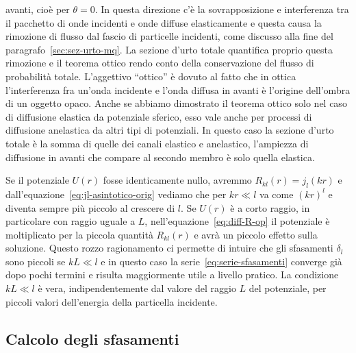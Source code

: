 \documentclass[a4paper,fleqn,twoside,12pt]{article}
\begin{document}
avanti, cioè per $\theta=0$.  In questa direzione c'è la sovrapposizione e
interferenza tra il pacchetto di onde incidenti e onde diffuse elasticamente e
questa causa la rimozione di flusso dal fascio di particelle incidenti, come
discusso alla fine del paragrafo~\ref{sec:sez-urto-mq}.  La sezione d'urto
totale quantifica proprio questa rimozione e il teorema ottico rendo conto della
conservazione del flusso di probabilità totale.  L'aggettivo ``ottico'' è dovuto
al fatto che in ottica l'interferenza fra un'onda incidente e l'onda diffusa in
avanti è l'origine dell'ombra di un oggetto opaco.  Anche se abbiamo dimostrato
il teorema ottico solo nel caso di diffusione elastica da potenziale sferico,
esso vale anche per processi di diffusione anelastica da altri tipi di
potenziali.  In questo caso la sezione d'urto totale è la somma di quelle dei
canali elastico e anelastico, l'ampiezza di diffusione in avanti che compare al
secondo membro è solo quella elastica.

Se il potenziale $U(r)$ fosse identicamente nullo, avremmo
$R_{kl}(r) = j_{l}(kr)$ e dall'equazione~\eqref{eq:jl-asintotico-orig} vediamo
che per $kr \ll l$ va come $(kr)^{l}$ e diventa sempre più piccolo al crescere
di $l$.  Se $U(r)$ è a corto raggio, in particolare con raggio uguale a $L$,
nell'equazione~\eqref{eq:diff-R-op} il potenziale è moltiplicato per la piccola
quantità $R_{kl}(r)$ e avrà un piccolo effetto sulla soluzione.  Questo rozzo
ragionamento ci permette di intuire che gli sfasamenti $\delta_{l}$ sono piccoli
se $kL \ll l$ e in questo caso la serie~\eqref{eq:serie-sfasamenti} converge già
dopo pochi termini e risulta maggiormente utile a livello pratico.  La
condizione $kL \ll l$ è vera, indipendentemente dal valore del raggio $L$ del
potenziale, per piccoli valori dell'energia della particella incidente.


\subsection{Calcolo degli sfasamenti}
\label{sec:calcolo-sfasamenti}
\end{document}
